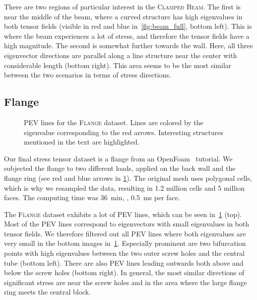 %
%

%
There are two regions of particular interest in the \textsc{Clamped Beam}.
%
The first is near the middle of the beam, where a curved structure has high
eigenvalues in both tensor fields (visible in red and blue
in~\cref{fig:beam_full}, bottom left).
%
This is where the beam experiences a lot of stress, and therefore the tensor
fields have a high magnitude.
%
The second is somewhat further towards the wall.
%
Here, all three eigenvector directions are parallel along a line structure near
the center with considerable length (bottom right).
%
This area seems to be the most similar between the two scenarios in terms of
stress directions.
%
%
\subsection{Flange} %
\label{ssub:flange}
%
\begin{figure}
    \setlength\figurewidth\textwidth
    \centering
    
    \caption{\ac{PEV} lines for the \textsc{Flange} dataset. Lines are colored
             by the eigenvalue corresponding to the red arrows. Interesting
             structures mentioned in the text are highlighted.}
    \label{fig:flange_filtered}
\end{figure}
%
%
%
%
%
Our final stress tensor dataset is a flange from an OpenFoam~\cite{OpenFOAMWWW}
tutorial.
%
We subjected the flange to two different loads, applied on the back wall and the
flange ring (see red and blue arrows in \cref{fig:flange_filtered}).
%
The original mesh uses polygonal cells, which is why we resampled the data,
resulting in \num{1.2} million cells and \num{5} million faces.
%
The computing time was \SI{36}{\minute}, \ie, \SI{0.5}{\milli\second} per face.
%

%
The \textsc{Flange} dataset exhibits a lot of \ac{PEV} lines, which can be seen
in~\cref{fig:flange_filtered} (top).
%
Most of the \ac{PEV} lines correspond to eigenvectors with small eigenvalues in
both tensor fields.
%
We therefore filtered out all \ac{PEV} lines where both eigenvalues are very
small in the bottom images in~\cref{fig:flange_filtered}.
%
Especially prominent are two bifurcation points with high eigenvalues between
the two outer screw holes and the central tube (bottom left).
%
There are also \ac{PEV} lines leading outwards both above and below the screw
holes (bottom right).
%
In general, the most similar directions of significant stress are near the screw
holes and in the area where the large flange ring meets the central block.
%
%
%
